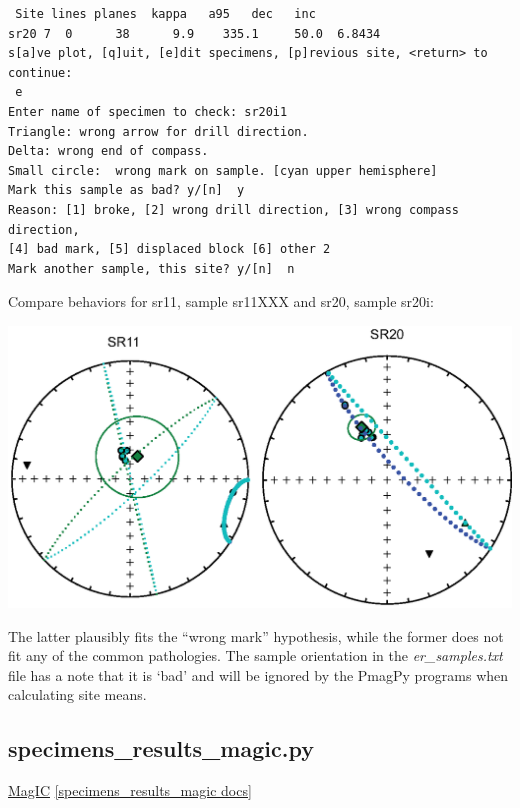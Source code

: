 \documentclass[11pt]{book}
\begin{document}
{\begin{verbatim}
 Site lines planes  kappa   a95   dec   inc
sr20 7  0      38      9.9    335.1     50.0  6.8434
s[a]ve plot, [q]uit, [e]dit specimens, [p]revious site, <return> to continue:
 e
Enter name of specimen to check: sr20i1
Triangle: wrong arrow for drill direction.
Delta: wrong end of compass.
Small circle:  wrong mark on sample. [cyan upper hemisphere]
Mark this sample as bad? y/[n]  y
Reason: [1] broke, [2] wrong drill direction, [3] wrong compass direction,
[4] bad mark, [5] displaced block [6] other 2
Mark another sample, this site? y/[n]  n
\end{verbatim}


Compare behaviors for sr11, sample sr11XXX and sr20, sample sr20i:

\includegraphics[width=15cm]{EPSfiles/site_edit_magic.eps}

  The latter plausibly fits the ``wrong mark'' hypothesis, while the former does not fit any of the common pathologies.  The sample orientation in the {\it er\_samples.txt} file has a note that it is `bad' and will be ignored by the PmagPy programs when calculating site means.





\subsection{specimens\_results\_magic.py}
\href{#MagIC}{MagIC}
\href{https://github.com/PmagPy/PmagPy/blob/master/programs/specimens_results_magic.py}{[specimens\_results\_magic docs]}

}
\end{document}
